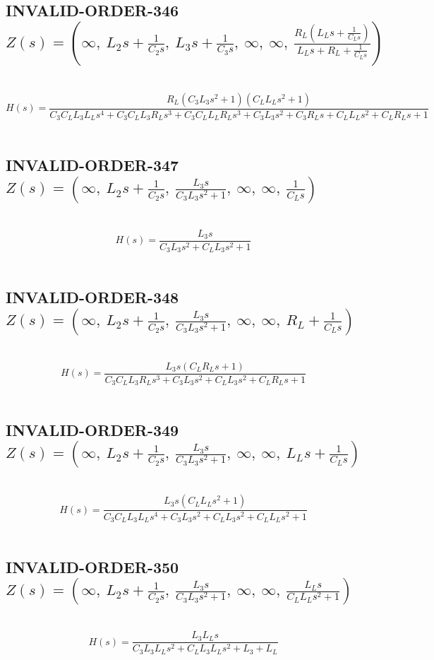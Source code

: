 \documentclass{article}
\begin{document}
\subsection{INVALID-ORDER-346 $Z(s) = \left( \infty, \  L_{2} s + \frac{1}{C_{2} s}, \  L_{3} s + \frac{1}{C_{3} s}, \  \infty, \  \infty, \  \frac{R_{L} \left(L_{L} s + \frac{1}{C_{L} s}\right)}{L_{L} s + R_{L} + \frac{1}{C_{L} s}}\right)$ } \ 
\textbf{\[H(s) = \frac{R_{L} \left(C_{3} L_{3} s^{2} + 1\right) \left(C_{L} L_{L} s^{2} + 1\right)}{C_{3} C_{L} L_{3} L_{L} s^{4} + C_{3} C_{L} L_{3} R_{L} s^{3} + C_{3} C_{L} L_{L} R_{L} s^{3} + C_{3} L_{3} s^{2} + C_{3} R_{L} s + C_{L} L_{L} s^{2} + C_{L} R_{L} s + 1}\] } \ 
\subsection{INVALID-ORDER-347 $Z(s) = \left( \infty, \  L_{2} s + \frac{1}{C_{2} s}, \  \frac{L_{3} s}{C_{3} L_{3} s^{2} + 1}, \  \infty, \  \infty, \  \frac{1}{C_{L} s}\right)$ } \ 
\textbf{\[H(s) = \frac{L_{3} s}{C_{3} L_{3} s^{2} + C_{L} L_{3} s^{2} + 1}\] } \ 
\subsection{INVALID-ORDER-348 $Z(s) = \left( \infty, \  L_{2} s + \frac{1}{C_{2} s}, \  \frac{L_{3} s}{C_{3} L_{3} s^{2} + 1}, \  \infty, \  \infty, \  R_{L} + \frac{1}{C_{L} s}\right)$ } \ 
\textbf{\[H(s) = \frac{L_{3} s \left(C_{L} R_{L} s + 1\right)}{C_{3} C_{L} L_{3} R_{L} s^{3} + C_{3} L_{3} s^{2} + C_{L} L_{3} s^{2} + C_{L} R_{L} s + 1}\] } \ 
\subsection{INVALID-ORDER-349 $Z(s) = \left( \infty, \  L_{2} s + \frac{1}{C_{2} s}, \  \frac{L_{3} s}{C_{3} L_{3} s^{2} + 1}, \  \infty, \  \infty, \  L_{L} s + \frac{1}{C_{L} s}\right)$ } \ 
\textbf{\[H(s) = \frac{L_{3} s \left(C_{L} L_{L} s^{2} + 1\right)}{C_{3} C_{L} L_{3} L_{L} s^{4} + C_{3} L_{3} s^{2} + C_{L} L_{3} s^{2} + C_{L} L_{L} s^{2} + 1}\] } \ 
\subsection{INVALID-ORDER-350 $Z(s) = \left( \infty, \  L_{2} s + \frac{1}{C_{2} s}, \  \frac{L_{3} s}{C_{3} L_{3} s^{2} + 1}, \  \infty, \  \infty, \  \frac{L_{L} s}{C_{L} L_{L} s^{2} + 1}\right)$ } \ 
\textbf{\[H(s) = \frac{L_{3} L_{L} s}{C_{3} L_{3} L_{L} s^{2} + C_{L} L_{3} L_{L} s^{2} + L_{3} + L_{L}}\] } \ 
\end{document}
